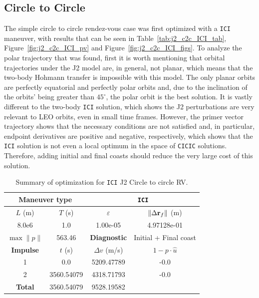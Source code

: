 \subsection{Circle to Circle}


The simple circle to circle rendez-vous case was first optimized with a \texttt{ICI} maneuver, with results that can be seen in Table~\ref{tab:j2_c2c_ICI_tab}, Figure~\ref{fig:j2_c2c_ICI_pv} and Figure~\ref{fig:j2_c2c_ICI_figs}. To analyze the polar trajectory that was found, first it is worth mentioning that orbital trajectories under the J2 model are, in general, not planar, which means that the two-body Hohmann transfer is impossible with this model. The only planar orbits are perfectly equatorial and perfectly polar orbits and, due to the inclination of the orbits' being greater than \(45^\circ\), the polar orbit is the best solution. It is vastly different to the two-body \texttt{ICI} solution, which shows the J2 perturbations are very relevant to LEO orbits, even in small time frames. However, the primer vector trajectory shows that the necessary conditions are not satisfied and, in particular, endpoint derivatives are positive and negative, respectively, which shows that the \texttt{ICI} solution is not even a local optimum in the space of \texttt{CICIC} solutions. Therefore, adding initial and final coasts should reduce the very large cost of this solution.

\begin{table}[htpb]
    \centering
    \begin{tabular}{cccc} \toprule
    \multicolumn{2}{c}{\textbf{Maneuver type}} & \multicolumn{2}{c}{\texttt{ICI}} \\ \midrule
    \(L\) (m) & \(T\) (s) & \(\varepsilon\) & \(\lVert \Delta \mathbf{r}_{f} \rVert\) (m)    \\ \midrule
    8.0e6          & 1.0          & 1.00e-05                & 4.97128e-01                        \\ \midrule
    \(\max \lVert p \rVert\) & 563.46     & \textbf{Diagnostic}   & Initial + Final coast        \\ \midrule
    \textbf{Impulse} & \(t\) (s) & \(\Delta v\) (m/s) & \(1 - p \cdot \hat{u}\) \\ \midrule
    1                 & 0.0          & 5209.47789             & -0.0                    \\
    2                 & 3560.54079          & 4318.71793             & -0.0                    \\\midrule
    \textbf{Total}   & 3560.54079          & 9528.19582             &                     \\ \bottomrule   
    \end{tabular}
    \caption{Summary of optimization for \texttt{ICI} J2 Circle to circle RV.}
    \label{tab:J2_ctcr_ICI_tab}
\end{table}

